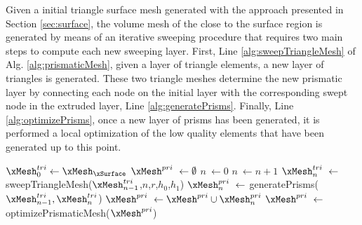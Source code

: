 \documentclass[1p]{elsarticle}
\begin{document}
Given a initial triangle surface mesh generated with the approach presented in Section \ref{sec:surface}, the volume mesh of the close to the surface region is generated by means of an iterative sweeping procedure that requires two main steps to compute each new sweeping layer.
First, Line \ref{alg:sweepTriangleMesh} of Alg. \ref{alg:prismaticMesh}, given a layer of triangle elements, a new layer of triangles is generated.
These two triangle meshes determine the new prismatic layer by connecting each node on the initial layer with the corresponding swept node in the extruded layer, Line \ref{alg:generatePrisms}.
Finally, Line \ref{alg:optimizePrisms}, once a new layer of prisms has been generated, 
it is performed a local optimization of the low quality elements that have been generated up to this point.

\begin{algorithm}[t!]
	\caption{Generation of the prismatic mesh of the SBL }
	\label{alg:prismaticMesh}
	\begin{algorithmic}[1]
		\renewcommand{\algorithmicrequire}{\textbf{Input:}}
		\renewcommand{\algorithmicensure}{\textbf{Output:}}
		\State $\xMesh^{tri}_0\gets\xMesh_\xSurface$
		\State $\xMesh^{pri}_{}\ \gets\emptyset$
		\State $n\ \gets0$
		\State $n\ \gets n+1$
		\State $\xMesh^{tri}_n\ \gets$sweepTriangleMesh($\xMesh^{tri}_{n-1}$,$n$,$r$,$h_0$,$h_1$)
		\label{alg:sweepTriangleMesh}
		\State $\xMesh^{pri}_{n}\ \gets$ generatePrisms($\xMesh^{tri}_{n-1},\xMesh^{tri}_n$)
		\label{alg:generatePrisms}
		\State $\xMesh^{pri}\ \gets\xMesh^{pri}\cup\xMesh^{pri}_{n}$
		\label{alg:generatePrismMesh}
		\State $\xMesh^{pri}_{}\ \gets$ optimizePrismaticMesh($\xMesh^{pri}_{}$)
		\label{alg:optimizePrisms}
		\EndWhile
		\EndFunction
	\end{algorithmic}
\end{algorithm}
\end{document}
